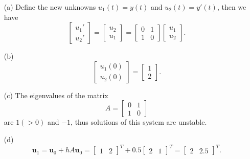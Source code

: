\begin{sol}
  \begin{itemize}
    \item[(a)]
  Define the new unknowns $u_1(t)=y(t)$ and $u_2(t)=y'(t)$,
  then we have
  \begin{displaymath}
    \begin{bmatrix}
      u_1' \\
      u_2'
    \end{bmatrix}
    =
    \begin{bmatrix}
      u_2 \\
      u_1
    \end{bmatrix}
    =
    \begin{bmatrix}
      0 & 1 \\
      1 & 0
    \end{bmatrix}
    \begin{bmatrix}
      u_1 \\
      u_2
    \end{bmatrix}.
  \end{displaymath}

\item[(b)]
  \begin{displaymath}
    \begin{bmatrix}
      u_1(0) \\
      u_2(0)
    \end{bmatrix}
    =
    \begin{bmatrix}
      1 \\
      2
    \end{bmatrix}.
  \end{displaymath}

\item[(c)]
  The eigenvalues of the matrix
  \begin{displaymath}
    A = 
    \begin{bmatrix}
      0 & 1 \\
      1 & 0
    \end{bmatrix}
  \end{displaymath}
  are $1(>0)$ and $-1$,
  thus solutions of this system are unstable.

\item[(d)]
  \begin{displaymath}
    \mathbf{u}_1 = \mathbf{u}_0 + hA\mathbf{u}_0 =
    \begin{bmatrix}
      1 & 2
    \end{bmatrix}^T
    +
    0.5
    \begin{bmatrix}
      2 & 1
    \end{bmatrix}^T
    =
    \begin{bmatrix}
      2 & 2.5
    \end{bmatrix}^T.
  \end{displaymath}


\end{itemize}
\end{sol}
